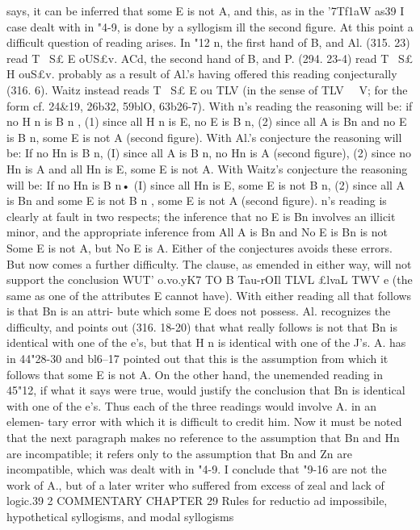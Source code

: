 {{{{{{{{{{{{{{{{{{{{says, it can be inferred that some E is not A, and this, as in the
'7Tf1aW as39 I
case dealt with in "4-9, is done by a syllogism ill the second
figure.
At this point a difficult question of reading arises. In "12 n,
the first hand of B, and Al. (315. 23) read T~ S£ E oUS£v{.
ACd, the second hand of B, and P. (294. 23-4) read T~ S£ H
ouS£v{. probably as a result of Al.'s having offered this reading
conjecturally (316. 6). Waitz instead reads T~ S£ E ou TLV{ (in
the sense of TLV~ ~V; for the form cf. 24&19, 26b32, 59blO, 63b26-7).
With n's reading the reasoning will be: if no H n is B n , (1) since
all H n is E, no E is B n, (2) since all A is Bn and no E is B n, some
E is not A (second figure). With Al.'s conjecture the reasoning
will be: If no Hn is B n, (I) since all A is B n, no Hn is A (second
figure), (2) since no Hn is A and all Hn is E, some E is not A.
With Waitz's conjecture the reasoning will be: If no Hn is B n•
(I) since all Hn is E, some E is not B n, (2) since all A is Bn and
some E is not B n , some E is not A (second figure).
n's reading is clearly at fault in two respects; the inference that
no E is Bn involves an illicit minor, and the appropriate inference
from All A is Bn and No E is Bn is not Some E is not A, but No
E is A. Either of the conjectures avoids these errors.
But now comes a further difficulty. The clause, as emended
in either way, will not support the conclusion WUT' o.vo.yK7} TO B
Tau-rOIl TLVL £lvaL TWV e (the same as one of the attributes E cannot
have). With either reading all that follows is that Bn is an attri-
bute which some E does not possess. Al. recognizes the difficulty,
and points out (316. 18-20) that what really follows is not that Bn
is identical with one of the e's, but that H n is identical with one
of the J's. A. has in 44"28-30 and bl6--17 pointed out that this is
the assumption from which it follows that some E is not A.
On the other hand, the unemended reading in 45"12, if what it says
were true, would justify the conclusion that Bn is identical with
one of the e's.
Thus each of the three readings would involve A. in an elemen-
tary error with which it is difficult to credit him. Now it must
be noted that the next paragraph makes no reference to the
assumption that Bn and Hn are incompatible; it refers only to
the assumption that Bn and Zn are incompatible, which was
dealt with in "4-9. I conclude that "9-16 are not the work of A.,
but of a later writer who suffered from excess of zeal and lack of
logic.39 2
COMMENTARY
CHAPTER 29
Rules for reductio ad impossibile, hypothetical syllogisms, and
modal syllogisms
}}}}}}}}}}}}}}}}}}}}}}

